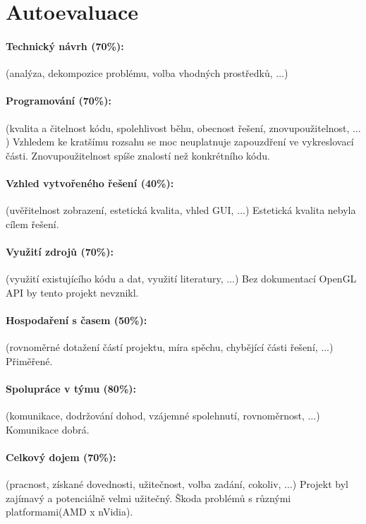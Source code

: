 \documentclass[11pt,a4paper]{article}
\begin{document}
\section{Autoevaluace}

\paragraph{Technický návrh (70\%):} (analýza, dekompozice problému, volba
vhodných prostředků, $\ldots$) 


\paragraph{Programování (70\%):} (kvalita a čitelnost kódu, spolehlivost běhu,
obecnost řešení, znovupoužitelnost, $\ldots$)
Vzhledem ke kratšímu rozsahu se moc neuplatnuje zapouzdření ve vykreslovací části. Znovupoužitelnost
spíše znalostí než konkrétního kódu.

\paragraph{Vzhled vytvořeného řešení (40\%):} (uvěřitelnost zobrazení,
estetická kvalita, vhled GUI, $\ldots$)
Estetická kvalita nebyla cílem řešení.

\paragraph{Využití zdrojů (70\%):} (využití existujícího kódu a dat, využití
literatury, $\ldots$)
Bez dokumentací OpenGL API by tento projekt nevznikl.

\paragraph{Hospodaření s časem (50\%):} (rovnoměrné dotažení částí projektu,
míra spěchu, chybějící části řešení, $\ldots$)
Přiměřené. 

\paragraph{Spolupráce v týmu (80\%):} (komunikace, dodržování dohod, vzájemné
spolehnutí, rovnoměrnost, $\ldots$)
Komunikace dobrá.

\paragraph{Celkový dojem (70\%):} (pracnost, získané dovednosti, užitečnost,
volba zadání, cokoliv, $\ldots$)
Projekt byl zajímavý a potenciálně velmi užitečný. Škoda problémů s různými platformami(AMD x nVidia).
\end{document}
